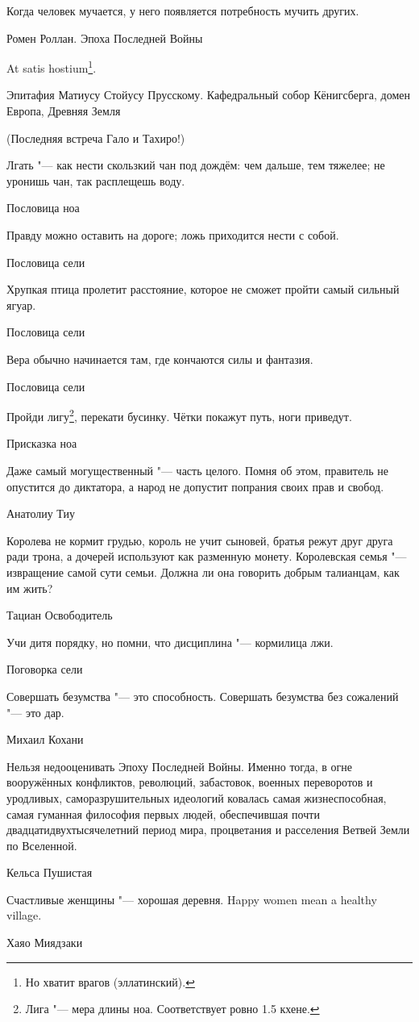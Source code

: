 \epigraph
{Когда человек мучается, у него появляется потребность мучить других.}
{Ромен Роллан.
Эпоха Последней Войны}

\epigraph
{At satis hostium\footnote
{Но хватит врагов (эллатинский). \authornote}.}
{Эпитафия Матиусу Стойусу Прусскому.
Кафедральный собор Кёнигсберга, домен Европа, Древняя Земля}

(Последняя встреча Гало и Тахиро!)

\epigraph
{Лгать "--- как нести скользкий чан под дождём: чем дальше, тем тяжелее;
не уронишь чан, так расплещешь воду.}
{Пословица ноа}

\epigraph
{Правду можно оставить на дороге;
ложь приходится нести с собой.}
{Пословица сели}

\epigraph
{Хрупкая птица пролетит расстояние, которое не сможет пройти самый сильный ягуар.}
{Пословица сели}

\epigraph
{Вера обычно начинается там, где кончаются силы и фантазия.}
{Пословица сели}

\epigraph
{Пройди лигу\footnote
{Лига "--- мера длины ноа. Соответствует ровно 1.5 кхене. \authornote},
перекати бусинку.
Чётки покажут путь, ноги приведут.}
{Присказка ноа}

\epigraph
{Даже самый могущественный "--- часть целого.
Помня об этом, правитель не опустится до диктатора, а народ не допустит попрания своих прав и свобод.}
{Анатолиу Тиу}

\epigraph
{Королева не кормит грудью, король не учит сыновей, братья режут друг друга ради трона, а дочерей используют как разменную монету.
Королевская семья "--- извращение самой сути семьи.
Должна ли она говорить добрым талианцам, как им жить?}
{Тациан Освободитель}

\epigraph
{Учи дитя порядку, но помни, что дисциплина "--- кормилица лжи.}
{Поговорка сели}

\epigraph
{Совершать безумства "--- это способность.
Совершать безумства без сожалений "--- это дар.}
{Михаил Кохани}

\epigraph
{Нельзя недооценивать Эпоху Последней Войны.
Именно тогда, в огне вооружённых конфликтов, революций, забастовок, военных переворотов и уродливых, саморазрушительных идеологий ковалась самая жизнеспособная, самая гуманная философия первых людей, обеспечившая почти двадцатидвухтысячелетний период мира, процветания и расселения Ветвей Земли по Вселенной.}
{Кельса Пушистая}

\epigraph{
{Счастливые женщины "--- хорошая деревня.}
{Happy women mean a healthy village.}
}{Хаяо Миядзаки}

